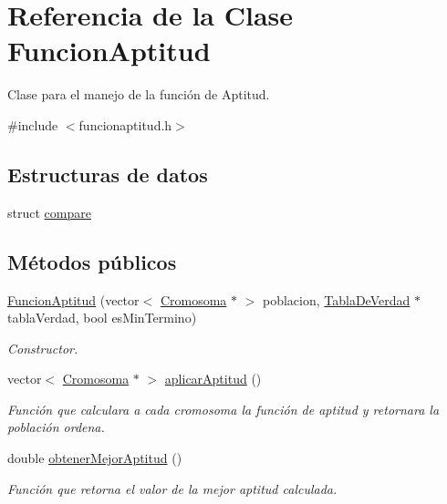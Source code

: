 \hypertarget{classFuncionAptitud}{\section{Referencia de la Clase Funcion\-Aptitud}
\label{classFuncionAptitud}
}


Clase para el manejo de la función de Aptitud.  




{\ttfamily \#include $<$funcionaptitud.\-h$>$}

\subsection*{Estructuras de datos}
\begin{DoxyCompactItemize}
\item 
struct \hyperlink{structFuncionAptitud_1_1compare}{compare}
\end{DoxyCompactItemize}
\subsection*{Métodos públicos}
\begin{DoxyCompactItemize}
\item 
\hyperlink{classFuncionAptitud_a31336bdb3aa833da6c06f6b27e47522b}{Funcion\-Aptitud} (vector$<$ \hyperlink{classCromosoma}{Cromosoma} $\ast$ $>$ poblacion, \hyperlink{classTablaDeVerdad}{Tabla\-De\-Verdad} $\ast$tabla\-Verdad, bool es\-Min\-Termino)
\begin{DoxyCompactList}\small\item\em Constructor. \end{DoxyCompactList}\item 
vector$<$ \hyperlink{classCromosoma}{Cromosoma} $\ast$ $>$ \hyperlink{classFuncionAptitud_a205f0e06db47f30aa8fdce674a41b94b}{aplicar\-Aptitud} ()
\begin{DoxyCompactList}\small\item\em Función que calculara a cada cromosoma la función de aptitud y retornara la población ordena. \end{DoxyCompactList}\item 
double \hyperlink{classFuncionAptitud_a4719bc3182eeba62dd27a595f659ee8c}{obtener\-Mejor\-Aptitud} ()
\begin{DoxyCompactList}\small\item\em Función que retorna el valor de la mejor aptitud calculada. \end{DoxyCompactList}\end{DoxyCompactItemize}


